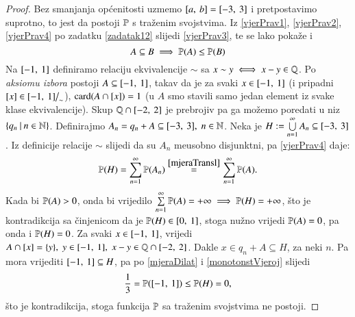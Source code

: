 
\begin{proof}
    Bez smanjanja op\' cenitosti uzmemo $[{a}, \:{b}]
    = [{-3}, \:{3}]$ i pretpostavimo suprotno, to jest da postoji
    $\mathbb{P}$ s tra\v zenim svojstvima. Iz \eqref{vjerPrav1},
    \eqref{vjerPrav2}, \eqref{vjerPrav4} po zadatku \ref{zadatak12}
    slijedi \eqref{vjerPrav3}, te se lako poka\v ze i
    \begin{equation} \label{monotonstVjeroj}
        A \subseteq B \implies \mathbb{P}({A}) \leq \mathbb{P}({B})
    \end{equation}
    Na $[{-1}, \:{1}]$ definiramo relaciju ekvivalencije $\sim$
    sa $x \sim y \iff x - y \in \mathbb{Q}$. Po \emph{aksiomu izbora} postoji
    $A \subseteq [{-1}, \:{1}]$, takav da je za svaki $x \in
    [{-1}, \:{1}]$ (i pripadni $[x] \in [{-1}, \:{1}] \big/
    _{\sim}$), $\textnormal{card}({A \cap [x]}) = 1$ (u $A$ smo stavili samo jedan
    element iz svake klase ekvivalencije).
    Skup $\mathbb{Q} \cap [{-2}, \:{2}]$ je prebrojiv pa ga mo\v zemo
    poredati u niz $\{{q_n} \: | \: {n \in \mathbb{N}}\}$. 
    Definirajmo $A_n = q_n + A \subseteq [{-3}, \:{3}], \; n \in
    \mathbb{N}$. Neka je $H := \bigcup\limits_{n=1}^{\infty} A_n \subseteq
    [{-3}, \:{3}]$. 
    Iz definicije relacije $\sim$ slijedi da su $A_n$ me\dj usobno
    disjunktni, pa \eqref{vjerPrav4} daje:
    \begin{equation*}
        \mathbb{P}({H}) = \sum\limits_{n=1}^{\infty} \mathbb{P}({A_n})
            \overset{\eqref{mjeraTransl}}{=} \sum\limits_{n=1}^{\infty}
            \mathbb{P}({A}).
    \end{equation*}
    Kada bi $\mathbb{P}({A}) > 0$, onda bi vrijedilo $\sum\limits_{n=1}^{\infty}
    \mathbb{P}({A}) = + \infty \implies \mathbb{P}({H}) = +\infty$, \v sto je
    kontradikcija sa \v cinjenicom da je $\mathbb{P}({H}) \in
    [{0}, \:{1}]$, stoga nu\v zno vrijedi $\mathbb{P}({A}) = 0$, pa onda
    i $\mathbb{P}({H}) = 0$.
    Za svaki $x \in [{-1}, \:{1}]$, vrijedi $A \cap [x] = \{y\},
    \; y \in [{-1}, \:{1}], \; x - y \in \mathbb{Q} \cap [{-2}, \:{2}]$.
    Dakle $x \in q_n + A \subseteq H$, za neki $n$. Pa mora vrijediti
    $[{-1}, \:{1}] \subseteq H$, pa po \eqref{mjeraDilat} i
    \eqref{monotonstVjeroj} slijedi
    \begin{equation*}
        \frac{1}{3} = \mathbb{P}({[{-1}, \:{1}]}) \leq \mathbb{P}({H}) = 0,
    \end{equation*}
    \v sto je kontradikcija, stoga funkcija $\mathbb{P}$ sa tra\v zenim
    svojstvima ne postoji.
\end{proof}

